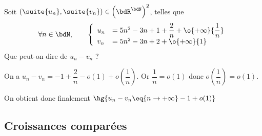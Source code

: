 \documentclass[a4paper,french,bookmarks]{article}
\begin{document}

\begin{example}{}{}
    Soit $\left(\suite{u_n},\suite{v_n}\right) \in \left(\bdR^\bdN\right)^2$, telles que \[ \forall n \in \bdN, \qquad \left\lbrace\begin{array}{ll}
        u_n &= 5n^2-3n+1+\dfrac{2}{n} + \o{+\infty}{\dfrac{1}{n}} \\
        v_n &= 5n^2 - 3n + 2 + \o{+\infty}{1}
    \end{array}\right.\]
    Que peut-on dire de $u_n - v_n$ ? \tcblower
    
    On a $u_n - v_n = -1 + \dfrac{2}{n} - o(1) + o\left(\dfrac{1}{n}\right)$. Or $\dfrac{1}{n}=o(1)$ donc $o\left(\dfrac{1}{n}\right) = o(1)$.
    
    On obtient donc finalement $\hg{u_n - v_n \eq{n \to +\infty} -1 + o(1)}$
\end{example}



\subsection{Croissances comparées}
\end{document}
